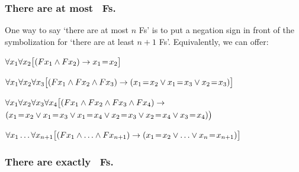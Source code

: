 \subsubsection*{There are at most \blank\ Fs.}
\label{summary:atmost}

One way to say `there are at most $n$ Fs' is to put a negation sign in front of the symbolization for `there are at least $n+1$ Fs'. Equivalently, we can offer:
\begin{ekey}
\item[\text{one}] $\forall x_1\forall x_2\bigl[(Fx_1 \mathbin{\wedge} Fx_2) \rightarrow x_1\!=\! x_2\bigr]$
\item[\text{two}] $\forall x_1\forall x_2\forall x_3\bigl[(Fx_1 \mathbin{\wedge} Fx_2 \mathbin{\wedge} Fx_3) \rightarrow (x_1\!=\! x_2 \vee x_1\!=\! x_3 \vee x_2\!=\! x_3)\bigr]$
\item[\text{three}] $\forall x_1\forall x_2\forall x_3\forall x_4\bigl[(Fx_1 \mathbin{\wedge} Fx_2 \mathbin{\wedge} Fx_3 \mathbin{\wedge} Fx_4) \rightarrow \phantom{.}$\\
\phantom{$\exists x_1 \exists x_2$}$(x_1\eid x_2 \eor x_1\eid x_3 \eor x_1\eid x_4 \eor x_2\eid x_3 \eor x_2\eid x_4 \eor x_3\eid x_4)\bigr)$
\item[n]$\forall x_1\ldots\forall x_{n+1}
\bigl[(Fx_1\mathbin{\wedge} \ldots \mathbin{\wedge} Fx_{n+1}) \rightarrow (x_1\!=\! x_2 \vee \ldots \vee x_n\!=\! x_{n+1})\bigr]$ 
\end{ekey}

\subsubsection*{There are exactly \blank\ Fs.}
\label{summary:exactly}

